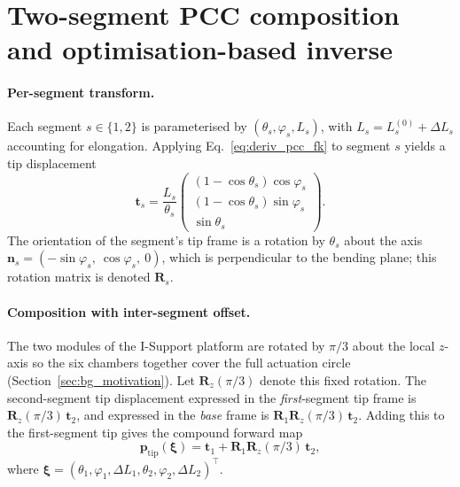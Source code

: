 \section{Two-segment PCC composition and optimisation-based inverse}
\label{app:deriv_pcc_multi}

\paragraph{Per-segment transform.}
Each segment $s \in \{1, 2\}$ is parameterised by $(\theta_{s}, \varphi_{s}, L_{s})$, with $L_{s} = L_{s}^{(0)} + \Delta L_{s}$ accounting for elongation. Applying Eq.~\eqref{eq:deriv_pcc_fk} to segment $s$ yields a tip displacement
\begin{equation}
  \mathbf{t}_{s} = \frac{L_{s}}{\theta_{s}} \begin{pmatrix} (1 - \cos\theta_{s})\cos\varphi_{s} \\ (1 - \cos\theta_{s})\sin\varphi_{s} \\ \sin\theta_{s} \end{pmatrix}.
\end{equation}
The orientation of the segment's tip frame is a rotation by $\theta_{s}$ about the axis $\mathbf{n}_{s} = (-\sin\varphi_{s},\ \cos\varphi_{s},\ 0)$, which is perpendicular to the bending plane; this rotation matrix is denoted $\mathbf{R}_{s}$.

\paragraph{Composition with inter-segment offset.}
The two modules of the I-Support platform are rotated by $\pi/3$ about the local $z$-axis so the six chambers together cover the full actuation circle (Section~\ref{sec:bg_motivation}). Let $\mathbf{R}_{z}(\pi/3)$ denote this fixed rotation. The second-segment tip displacement expressed in the \emph{first}-segment tip frame is $\mathbf{R}_{z}(\pi/3)\, \mathbf{t}_{2}$, and expressed in the \emph{base} frame is $\mathbf{R}_{1} \mathbf{R}_{z}(\pi/3)\, \mathbf{t}_{2}$. Adding this to the first-segment tip gives the compound forward map
\begin{equation}
  \mathbf{p}_{\mathrm{tip}}(\boldsymbol{\xi}) = \mathbf{t}_{1} + \mathbf{R}_{1} \mathbf{R}_{z}(\pi/3)\, \mathbf{t}_{2},
  \label{eq:deriv_pcc_multi_fk}
\end{equation}
where $\boldsymbol{\xi} = (\theta_{1}, \varphi_{1}, \Delta L_{1}, \theta_{2}, \varphi_{2}, \Delta L_{2})^{\top}$.

